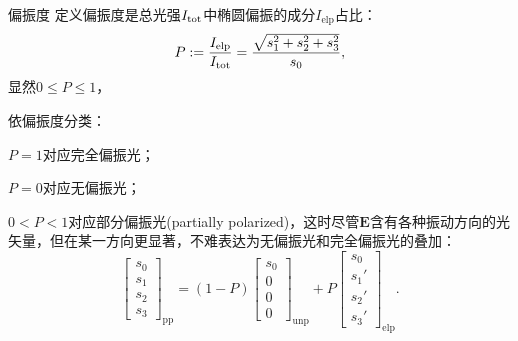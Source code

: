 \begin{definition}{偏振度}{}
    定义偏振度是总光强$I_\mathrm{tot}$中椭圆偏振的成分$I_\text{elp}$占比：
    \[
        P:=\frac{I_\text{elp}}{I_\mathrm{tot}}=\frac{\sqrt{s_1^2+s_2^2+s_3^2}}{s_0},
    \]
    显然$0\leqslant P\leqslant 1$，
\end{definition}
\begin{corollary}
    依偏振度分类：
    \begin{compactitem}
    	\item $P=1$对应完全偏振光；
    	\item $P=0$对应无偏振光；
    	\item $0<P<1$对应部分偏振光(partially polarized)，这时尽管$\bm E$含有各种振动方向的光矢量，但在某一方向更显著，不难表达为无偏振光和完全偏振光的叠加：
        \[
            \begin{bmatrix}
                s_0\\s_1\\s_2\\s_3
            \end{bmatrix}_\text{pp}=(1-P)
            \begin{bmatrix}
                s_0\\0\\0\\0
            \end{bmatrix}_\text{unp}+P
            \begin{bmatrix}
                s_0\\s_1'\\s_2'\\s_3'
            \end{bmatrix}_\text{elp}.
        \]
    \end{compactitem}
\end{corollary}
